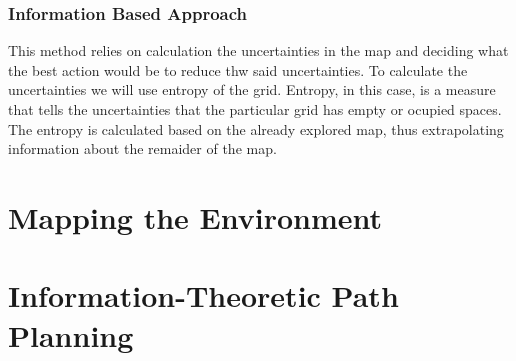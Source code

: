 \documentclass[a4paper,12pt]{article}
\begin{document}
				\subsubsection{Information Based Approach}
					This method relies on calculation the uncertainties in the map and deciding what the best action would be to reduce thw said uncertainties. To calculate the uncertainties we will use entropy of the grid. Entropy, in this case, is a measure that tells the uncertainties that the particular grid has empty or ocupied spaces. The entropy is calculated based on the already explored map, thus extrapolating information about the remaider of the map.


	
	
	\section{Mapping the Environment}
	
	
	
	\section{Information-Theoretic Path Planning}
	
	
	
	\newpage
	
	
	\newpage
	\appendix
	\appendixpage
	\addappheadtotoc
	
\end{document}
